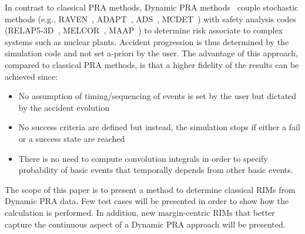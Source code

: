 In contrast to classical PRA methods, Dynamic PRA methods~\cite{} couple stochastic methods 
(e.g., RAVEN~\cite{}, ADAPT~\cite{}, ADS~\cite{}, MCDET~\cite{}) with safety analysis 
codes (RELAP5-3D~\cite{}, MELCOR~\cite{}, MAAP~\cite{}) to determine risk associate to 
complex systems such as nuclear plants. Accident progression is thus determined by the 
simulation code and not set a-priori by the user. The advantage of this approach, 
compared to classical PRA methods, is that a higher fidelity of the results can be achieved since:
\begin{itemize}
  \item No assumption of timing/sequencing of events is set by the user but dictated by the 
        accident evolution
  \item No success criteria are defined but instead, the simulation stops if either a fail 
        or a success state are reached
  \item There is no need to compute convolution integrals in order to specify probability of 
        basic events that temporally depends from other basic events.
\end{itemize}

The scope of this paper is to present a method to determine classical RIMs from Dynamic PRA 
data. Few test cases will be presented in order to show how the calculation is performed. 
In addition, new margin-centric RIMs that better capture the continuous aspect of a Dynamic 
PRA approach will be presented.

